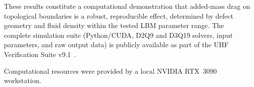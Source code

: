 \documentclass[reprint,amsmath,amssymb,aps,pre,floatfix]{revtex4-2}
\begin{document}
These results constitute a computational demonstration that
added-mass drag on topological boundaries is a robust, reproducible
effect, determined by defect geometry and fluid density within the
tested LBM parameter range.  The complete simulation suite (Python/CUDA, D2Q9
and D3Q19 solvers, input parameters, and raw output data) is publicly
available as part of the UHF Verification Suite v9.1~\cite{UHFCode}.

\begin{acknowledgments}
Computational resources were provided by a local NVIDIA RTX~3090 workstation.
\end{acknowledgments}


\end{document}

